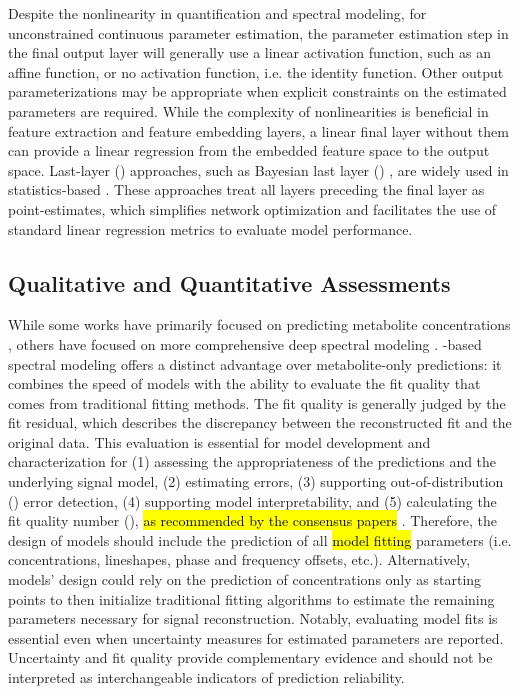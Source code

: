 Despite the nonlinearity in \DL quantification and spectral modeling, for unconstrained continuous parameter estimation, the parameter estimation step in the final output layer will generally use a linear activation function, such as an affine function, or no activation function, i.e. the identity function. Other output parameterizations may be appropriate when explicit constraints on the estimated parameters are required. While the complexity of nonlinearities is beneficial in feature extraction and feature embedding layers, a linear final layer without them can provide a linear regression from the embedded feature space to the output space. Last-layer (\LL) approaches, such as Bayesian last layer (\BLL) \cite{Weber2018, Brosse2020, Watson2021, Fiedler2023}, are widely used in statistics-based \DL. These approaches treat all layers preceding the final layer as point-estimates, which simplifies network optimization and facilitates the use of standard linear regression metrics to evaluate model performance.

\subsection{Qualitative and Quantitative Assessments} %
\label{sec: qual and quant}
While some works have primarily focused on predicting metabolite concentrations \cite{Hatami2018, Shamaei2021, Shamaei2023}, others have focused on more comprehensive deep spectral modeling \cite{Gurbani2019, Iqbal2021, Rizzo2023, LaMaster2024, Shamaei2025}. \DL-based spectral modeling offers a distinct advantage over metabolite-only predictions: it combines the speed of \DL models with the ability to evaluate the fit quality that comes from traditional fitting methods. The fit quality is generally judged by the fit residual, which describes the discrepancy between the reconstructed fit and the original data. This evaluation is essential for model development and characterization for (1) assessing the appropriateness of the predictions and the underlying signal model, (2) estimating errors, (3) supporting out-of-distribution (\OOD) error detection, (4) supporting model interpretability, and (5) calculating the fit quality number (\FQN), \hl{as recommended by the consensus papers }\cite{Near2021, Kreis2020}. Therefore, the design of \DL models should include the prediction of all \hl{model fitting} parameters (i.e. concentrations, lineshapes, phase and frequency offsets, etc.). Alternatively, \DL models' design could rely on the prediction of concentrations only as starting points to then initialize traditional fitting algorithms to estimate the remaining parameters necessary for signal reconstruction. Notably, evaluating model fits is essential even when uncertainty measures for estimated parameters are reported. Uncertainty and fit quality provide complementary evidence and should not be interpreted as interchangeable indicators of prediction reliability.

